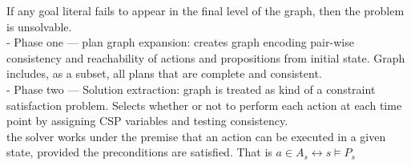 \documentclass[
a4paper, %
11pt, %
onecolumn, %
openany, %
]{memoir}
\begin{document}
{If any goal literal fails to appear in the final level of the graph, then the problem is unsolvable. \\

- Phase one --- plan graph expansion: creates graph encoding pair-wise consistency and reachability of actions and propositions from initial state. Graph includes, as a subset, all plans that are complete and consistent.\\
- Phase two --- Solution extraction: graph is treated as kind of a constraint satisfaction problem. Selects whether or not to perform each action at each time point by assigning CSP variables and testing consistency.\\

the solver works under the premise that an action can be executed in a given state, provided the preconditions are satisfied. That is $a \in A_{s} \leftrightarrow s \models P_{s}$
}
\backmatter








\end{document}
